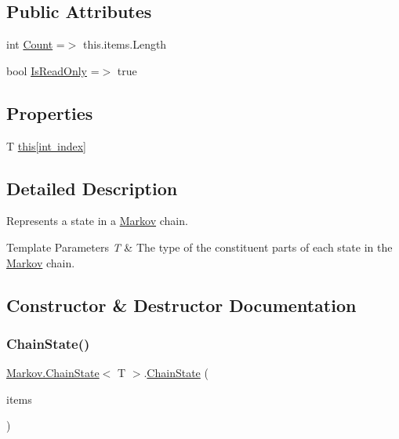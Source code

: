 \subsection*{Public Attributes}
\begin{DoxyCompactItemize}
\item 
int \mbox{\hyperlink{class_markov_1_1_chain_state_a514640cd4bfd2d2fae5162305dd13990}{Count}} =$>$ this.\+items.\+Length
\item 
bool \mbox{\hyperlink{class_markov_1_1_chain_state_af899470e8c30912c17125b8d365bde02}{Is\+Read\+Only}} =$>$ true
\end{DoxyCompactItemize}
\subsection*{Properties}
\begin{DoxyCompactItemize}
\item 
T \mbox{\hyperlink{class_markov_1_1_chain_state_ae06f12faf66236f004133d5cd08b22b4}{this\mbox{[}int index\mbox{]}}}
\end{DoxyCompactItemize}


\subsection{Detailed Description}
Represents a state in a \mbox{\hyperlink{namespace_markov}{Markov}} chain. 


\begin{DoxyTemplParams}{Template Parameters}
{\em T} & The type of the constituent parts of each state in the \mbox{\hyperlink{namespace_markov}{Markov}} chain.\\
\hline
\end{DoxyTemplParams}


\subsection{Constructor \& Destructor Documentation}
\mbox{\label{class_markov_1_1_chain_state_a350f2699a1eb55d8b041ff394c6ae3d4}} 
\subsubsection{\texorpdfstring{Chain\+State()}{ChainState()}\hspace{0.1cm}{\footnotesize\ttfamily [1/2]}}
{\footnotesize\ttfamily \mbox{\hyperlink{class_markov_1_1_chain_state}{Markov.\+Chain\+State}}$<$ T $>$.\mbox{\hyperlink{class_markov_1_1_chain_state}{Chain\+State}} (\begin{DoxyParamCaption}\item[{I\+Enumerable$<$ T $>$}]{items }\end{DoxyParamCaption})}



